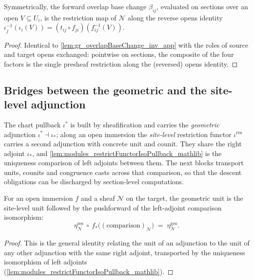 \begin{lemma}
  \label{lem:gr_overlapBaseChange_hom_app}
  Symmetrically, the forward overlap base change \(\beta_{ij}\), evaluated on sections
  over an open \(V \subseteq U_i\), is the restriction map of \(\mathcal{N}\) along the
  reverse opens identity \(\iota_j^{-1}(\iota_i(V)) = (t_{ij}\circ f_{ji})(f_{ij}^{-1}(V))\).
\end{lemma}
\begin{proof}
  \leanok
  Identical to \cref{lem:gr_overlapBaseChange_inv_app} with the roles of source and
  target opens exchanged: pointwise on sections, the composite of the four factors is
  the single presheaf restriction along the (reversed) opens identity.
\end{proof}

\subsection{Bridges between the geometric and the site-level adjunction}

The chart pullback \(\iota^{*}\) is built by sheafification and carries the
\emph{geometric} adjunction \(\iota^{*} \dashv \iota_{*}\); along an open immersion the
\emph{site-level} restriction functor \(\iota^{\mathrm{res}}\) carries a second
adjunction with concrete unit and counit. They share the right adjoint \(\iota_{*}\),
and \cref{lem:modules_restrictFunctorIsoPullback_mathlib} is the uniqueness comparison
of left adjoints between them. The next blocks transport units, counits and
congruence casts across that comparison, so that the descent obligations can be
discharged by section-level computations.

\begin{lemma}
  \label{lem:gr_restrictAdjunction_unit_iso}
  For an open immersion \(f\) and a sheaf \(\mathcal{N}\) on the target, the geometric
  unit is the site-level unit followed by the pushforward of the left-adjoint
  comparison isomorphism:
  \[
    \eta^{\mathrm{res}}_{\mathcal{N}}\ \circ\
      f_{*}\bigl((\text{comparison})_{\mathcal{N}}\bigr)
    \;=\; \eta^{\mathrm{geo}}_{\mathcal{N}}.
  \]
\end{lemma}
\begin{proof}
  \leanok
  This is the general identity relating the unit of an adjunction to the unit of any
  other adjunction with the same right adjoint, transported by the uniqueness
  isomorphism of left adjoints (\cref{lem:modules_restrictFunctorIsoPullback_mathlib}).
\end{proof}

